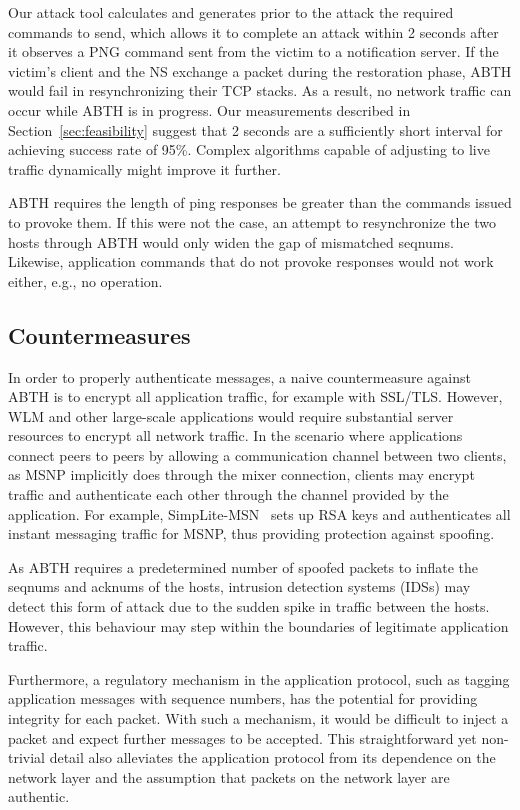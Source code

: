 \documentclass{sig-alternate}
\begin{document}
Our attack tool calculates and generates prior to the attack the required commands to send, which allows it to complete an attack within 2 seconds after it observes a PNG command sent from the victim to a notification server.
If the victim's client and the NS exchange a packet during the restoration phase, ABTH would fail in resynchronizing their TCP stacks.
As a result, no network traffic can occur while ABTH is in progress. 
Our measurements described in Section~\ref{sec:feasibility} suggest that 2 seconds are a sufficiently short interval for achieving success rate of 95\%.
Complex algorithms capable of adjusting to live traffic dynamically might improve it further. 

ABTH requires the length of ping responses be greater than the commands issued to provoke them.
If this were not the case, an attempt to resynchronize the two hosts through ABTH would only widen the gap of mismatched seqnums.
Likewise, application commands that do not provoke responses would not work either, e.g., no operation.

\subsection{Countermeasures}

In order to properly authenticate messages, a naive countermeasure against ABTH is to encrypt all application traffic, for example with SSL/TLS.
However, WLM and other large-scale applications would require substantial server resources to encrypt all network traffic.
In the scenario where applications connect peers to peers by allowing a communication channel between two clients, as MSNP implicitly does through the mixer connection, clients may encrypt traffic and authenticate each other through the channel provided by the application.
For example, SimpLite-MSN~\cite{secway:url} sets up RSA keys and authenticates all instant messaging traffic for MSNP, thus providing protection against spoofing.

As ABTH requires a predetermined number of spoofed packets to inflate the seqnums and acknums of the hosts, intrusion detection systems (IDSs) may detect this form of attack due to the sudden spike in traffic between the hosts.
However, this behaviour may step within the boundaries of legitimate application traffic.

Furthermore, a regulatory mechanism in the application protocol, such as tagging application messages with sequence numbers, has the potential for providing integrity for each packet.
With such a mechanism, it would be difficult to inject a packet and expect further messages to be accepted.
This straightforward yet non-trivial detail also alleviates the application protocol from its dependence on the network layer and the assumption that packets on the network layer are authentic.
\end{document}
